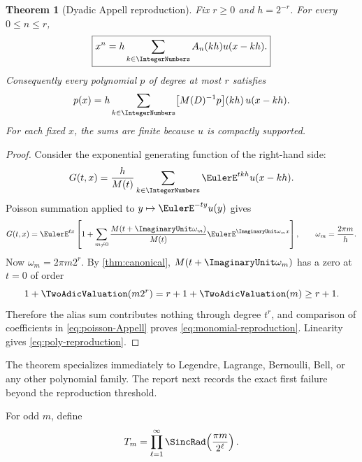 \documentclass[11pt,oneside]{article}
\newtheorem{theorem}{Theorem}[section]
\theoremstyle{definition}
\theoremstyle{remark}
\begin{document}
\begin{theorem}[Dyadic Appell reproduction]
\label{thm:reproduction}
Fix \(r\geq0\) and \(h=2^{-r}\).  For every \(0\leq n\leq r\),
\begin{equation}
 \boxed{\displaystyle
 x^n=h\sum_{k\in\IntegerNumbers}A_n(kh)u(x-kh).}
 \label{eq:monomial-reproduction}
\end{equation}
Consequently every polynomial \(p\) of degree at most \(r\) satisfies
\begin{equation}
 p(x)
 =h\sum_{k\in\IntegerNumbers}
 \bigl[M(D)^{-1}p\bigr](kh)\,u(x-kh).
 \label{eq:poly-reproduction}
\end{equation}
For each fixed \(x\), the sums are finite because \(u\) is compactly
supported.
\end{theorem}

\begin{proof}
Consider the exponential generating function of the right-hand side:
\[
 G(t,x)
 =\frac h{M(t)}
  \sum_{k\in\IntegerNumbers}\EulerE^{tkh}u(x-kh).
\]
Poisson summation applied to \(y\mapsto\EulerE^{-ty}u(y)\) gives
\begin{equation}
 G(t,x)
 =\EulerE^{tx}
 \left[
  1+\sum_{m\neq0}
   \frac{M(t+\ImaginaryUnit\omega_m)}{M(t)}
   \EulerE^{\ImaginaryUnit\omega_mx}
 \right],
 \qquad
 \omega_m=\frac{2\pi m}{h}.
 \label{eq:poisson-Appell}
\end{equation}
Now \(\omega_m=2\pi m2^r\).  By \cref{thm:canonical},
\(M(t+\ImaginaryUnit\omega_m)\) has a zero at \(t=0\) of order
\[
 1+\TwoAdicValuation(m2^r)=r+1+\TwoAdicValuation(m)\geq r+1.
\]
Therefore the alias sum contributes nothing through degree \(t^r\), and
comparison of coefficients in \eqref{eq:poisson-Appell} proves
\eqref{eq:monomial-reproduction}.  Linearity gives
\eqref{eq:poly-reproduction}.
\end{proof}

The theorem specializes immediately to Legendre, Lagrange, Bernoulli, Bell,
or any other polynomial family.  The report next records the exact first
failure beyond the reproduction threshold.

For odd \(m\), define
\begin{equation}
 T_m=\prod_{\ell=1}^{\infty}
 \SincRad\!\left(\frac{\pi m}{2^\ell}\right).
 \label{eq:Tm}
\end{equation}
\end{document}
